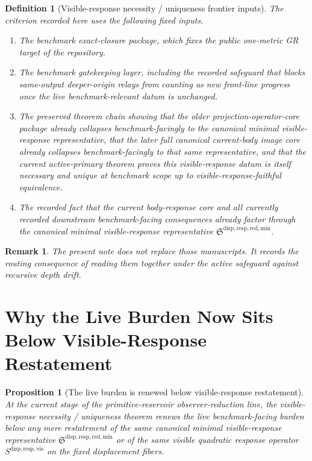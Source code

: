 \documentclass[11pt]{article}
\newcommand{\VisibleResponseOperator}{S^{\mathrm{disp,resp,vis}}}
\newcommand{\MinimalReducedStructure}{\mathfrak S^{\mathrm{disp,resp,red,min}}}
\newtheorem{definition}{Definition}
\newtheorem{proposition}{Proposition}
\newtheorem{remark}{Remark}
\begin{document}
\begin{definition}[Visible-response necessity / uniqueness frontier inputs]
The criterion recorded here uses the following fixed inputs.
\begin{enumerate}
    \item The benchmark exact-closure package, which fixes the public one-metric GR target of the repository.
    \item The benchmark gatekeeping layer, including the recorded safeguard that blocks same-output deeper-origin relays from counting as new front-line progress once the live benchmark-relevant datum is unchanged.
    \item The preserved theorem chain showing that the older projection-operator-core package already collapses benchmark-facingly to the canonical minimal visible-response representative, that the later full canonical current-body image core already collapses benchmark-facingly to that same representative, and that the current active-primary theorem proves this visible-response datum is itself necessary and unique at benchmark scope up to visible-response-faithful equivalence.
    \item The recorded fact that the current body-response core and all currently recorded downstream benchmark-facing consequences already factor through the canonical minimal visible-response representative \(\MinimalReducedStructure\).
\end{enumerate}
\end{definition}

\begin{remark}
The present note does not replace those manuscripts. It records the routing consequence of reading them together under the active safeguard against recursive depth drift.
\end{remark}

\section{Why the Live Burden Now Sits Below Visible-Response Restatement}

\begin{proposition}[The live burden is renewed below visible-response restatement]
At the current stage of the primitive-reservoir observer-reduction line, the visible-response necessity / uniqueness theorem renews the live benchmark-facing burden below any mere restatement of the same canonical minimal visible-response representative \(\MinimalReducedStructure\) or of the same visible quadratic response operator \(\VisibleResponseOperator\) on the fixed displacement fibers.
\end{proposition}
\end{document}
